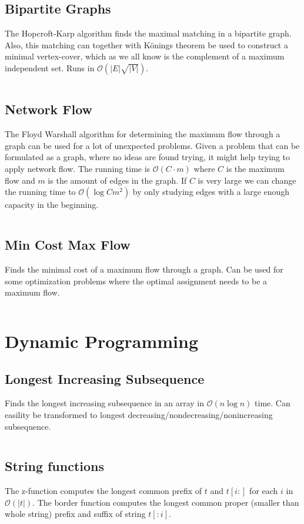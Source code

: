 \documentclass[8pt,a4paper,landscape,oneside]{amsart}
\newcommand{\codej}[1]{\inputminted[fontsize=\large,baselinestretch=1]{java}{code/#1}}
\newcommand{\codep}[1]{\inputminted[fontsize=\large,baselinestretch=1]{py}{code/#1}}
\newcommand{\bigO}{\mathcal{O}}
\begin{document}
\begin{multicols*}{2}
\begin{large}
    \subsection{Bipartite Graphs}
        The Hopcroft-Karp algorithm finds the maximal matching in a bipartite graph. Also, this matching can together with Könings theorem be used to construct a minimal vertex-cover, which as we all know is the complement of a maximum independent set. Runs in $\bigO (|E|\sqrt{|V|})$. 
        \codej{Graphs/BiGraph.java}
    \subsection{Network Flow}
        The Floyd Warshall algorithm for determining the maximum flow through a graph can be used for a lot of unexpected problems. Given a problem that can be formulated as a graph, where no ideas are found trying, it might help trying to apply network flow. The running time is $\bigO (C \cdot m)$ where $C$ is the maximum flow and $m$ is the amount of edges in the graph. 
        If $C$ is very large we can change the running time to $\bigO (\log{C}m^2)$ by only studying edges with a large enough capacity in the beginning.
        \codej{Graphs/NetworkFlow.java}
    \subsection{Min Cost Max Flow}
        Finds the minimal cost of a maximum flow through a graph. 
        Can be used for some optimization problems where the optimal assignment needs to be a maximum flow.
        \codej{Graphs/MinCostMaxFlow.java}

\section{Dynamic Programming}
    \subsection{Longest Increasing Subsequence}
        Finds the longest increasing subsequence in an array in $\bigO(n \log{n})$ time. Can easility be transformed to longest decreasing/nondecreasing/nonincreasing subsequence.
        \codej{DP/lis.java}
    \subsection{String functions}
        The z-function computes the longest common prefix of $t$ and $t[i:]$ for each $i$ in $\bigO(|t|)$.
        The border function computes the longest common proper (smaller than whole string) prefix and suffix of string $t[:i]$.
        \codep{DP/strings.py}


\end{large}
\end{multicols*}
\end{document}
